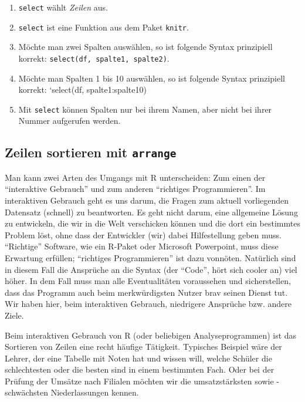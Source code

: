 \documentclass[12pt,ngerman,]{book}
\providecommand{\tightlist}{%
  \setlength{\itemsep}{0pt}\setlength{\parskip}{0pt}}
\begin{document}
\begin{enumerate}
\def\labelenumi{\arabic{enumi}.}
\tightlist
\item
  \texttt{select} wählt \emph{Zeilen} aus.
\item
  \texttt{select} ist eine Funktion aus dem Paket \texttt{knitr}.
\item
  Möchte man zwei Spalten auswählen, so ist folgende Syntax prinzipiell
  korrekt: \texttt{select(df,\ spalte1,\ spalte2)}.
\item
  Möchte man Spalten 1 bis 10 auswählen, so ist folgende Syntax
  prinzipiell korrekt: `select(df, spalte1:spalte10)
\item
  Mit \texttt{select} können Spalten nur bei ihrem Namen, aber nicht bei
  ihrer Nummer aufgerufen werden.
\end{enumerate}

\subsection{\texorpdfstring{Zeilen sortieren mit
\texttt{arrange}}{Zeilen sortieren mit arrange}}\label{zeilen-sortieren-mit-arrange}

Man kann zwei Arten des Umgangs mit R unterscheiden: Zum einen der
``interaktive Gebrauch'' und zum anderen ``richtiges Programmieren''. Im
interaktiven Gebrauch geht es uns darum, die Fragen zum aktuell
vorliegenden Datensatz (schnell) zu beantworten. Es geht nicht darum,
eine allgemeine Lösung zu entwickeln, die wir in die Welt verschicken
können und die dort ein bestimmtes Problem löst, ohne dass der
Entwickler (wir) dabei Hilfestellung geben muss. ``Richtige'' Software,
wie ein R-Paket oder Microsoft Powerpoint, muss diese Erwartung
erfüllen; ``richtiges Programmieren'' ist dazu vonnöten. Natürlich sind
in diesem Fall die Ansprüche an die Syntax (der ``Code'', hört sich
cooler an) viel höher. In dem Fall muss man alle Eventualitäten
voraussehen und sicherstellen, dass das Programm auch beim
merkwürdigsten Nutzer brav seinen Dienst tut. Wir haben hier, beim
interaktiven Gebrauch, niedrigere Ansprüche bzw. andere Ziele.

Beim interaktiven Gebrauch von R (oder beliebigen Analyseprogrammen) ist
das Sortieren von Zeilen eine recht häufige Tätigkeit. Typisches
Beispiel wäre der Lehrer, der eine Tabelle mit Noten hat und wissen
will, welche Schüler die schlechtesten oder die besten sind in einem
bestimmten Fach. Oder bei der Prüfung der Umsätze nach Filialen möchten
wir die umsatzstärksten sowie -schwächsten Niederlassungen kennen.
\end{document}
